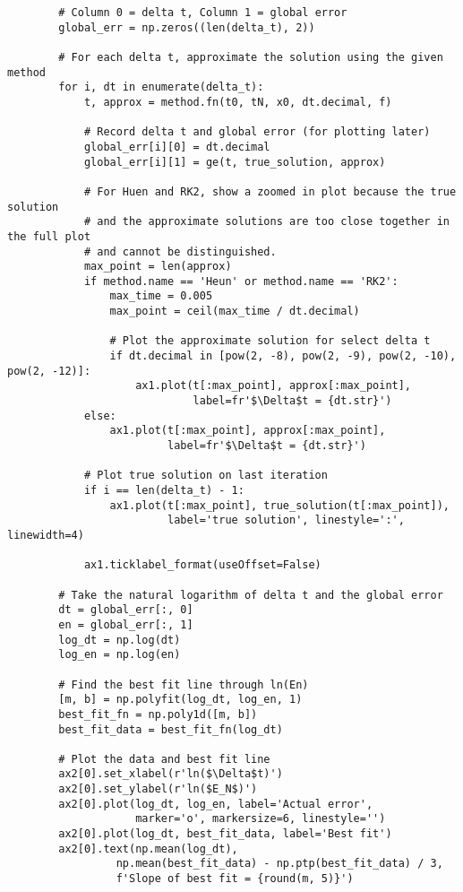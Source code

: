 \documentclass{article}
\begin{document}
\begin{verbatim}
        # Column 0 = delta t, Column 1 = global error
        global_err = np.zeros((len(delta_t), 2))
    
        # For each delta t, approximate the solution using the given method
        for i, dt in enumerate(delta_t):
            t, approx = method.fn(t0, tN, x0, dt.decimal, f)
    
            # Record delta t and global error (for plotting later)
            global_err[i][0] = dt.decimal
            global_err[i][1] = ge(t, true_solution, approx)
    
            # For Huen and RK2, show a zoomed in plot because the true solution
            # and the approximate solutions are too close together in the full plot
            # and cannot be distinguished.
            max_point = len(approx)
            if method.name == 'Heun' or method.name == 'RK2':
                max_time = 0.005
                max_point = ceil(max_time / dt.decimal)
    
                # Plot the approximate solution for select delta t
                if dt.decimal in [pow(2, -8), pow(2, -9), pow(2, -10), pow(2, -12)]:
                    ax1.plot(t[:max_point], approx[:max_point],
                             label=fr'$\Delta$t = {dt.str}')
            else:
                ax1.plot(t[:max_point], approx[:max_point],
                         label=fr'$\Delta$t = {dt.str}')
    
            # Plot true solution on last iteration
            if i == len(delta_t) - 1:
                ax1.plot(t[:max_point], true_solution(t[:max_point]),
                         label='true solution', linestyle=':', linewidth=4)
    
            ax1.ticklabel_format(useOffset=False)
    
        # Take the natural logarithm of delta t and the global error
        dt = global_err[:, 0]
        en = global_err[:, 1]
        log_dt = np.log(dt)
        log_en = np.log(en)
    
        # Find the best fit line through ln(En)
        [m, b] = np.polyfit(log_dt, log_en, 1)
        best_fit_fn = np.poly1d([m, b])
        best_fit_data = best_fit_fn(log_dt)
    
        # Plot the data and best fit line
        ax2[0].set_xlabel(r'ln($\Delta$t)')
        ax2[0].set_ylabel(r'ln($E_N$)')
        ax2[0].plot(log_dt, log_en, label='Actual error',
                    marker='o', markersize=6, linestyle='')
        ax2[0].plot(log_dt, best_fit_data, label='Best fit')
        ax2[0].text(np.mean(log_dt),
                 np.mean(best_fit_data) - np.ptp(best_fit_data) / 3,
                 f'Slope of best fit = {round(m, 5)}')
    

\end{verbatim}
\end{document}
